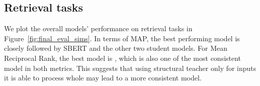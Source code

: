 














\subsection{Retrieval tasks}

We plot the overall models' performance on retrieval tasks in
Figure~\ref{fig:final_eval_sims}. In terms of MAP, the best performing model is
{\OnlyMSEStudent} closely followed by SBERT and the other two student models.
For Mean Reciprocal Rank, the best model is {\CosineStudent}, which is also one
of the most consistent model in both metrics. This suggests that using
structural teacher only for inputs it is able to process whole may lead to a
more consistent model.

